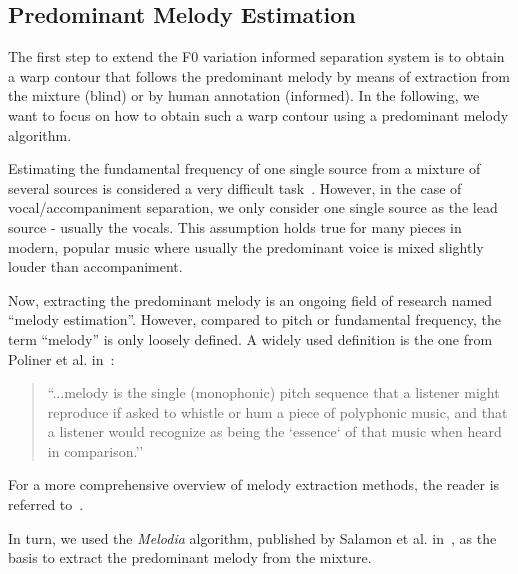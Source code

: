 \subsection{Predominant Melody Estimation}

The first step to extend the F0 variation informed separation system is to obtain a warp contour that follows the predominant melody by means of extraction from the mixture (blind) or by human annotation (informed).
In the following, we want to focus on how to obtain such a warp contour using a predominant melody algorithm.\par

Estimating the fundamental frequency of one single source from a mixture of several sources is considered a very difficult task~\cite{klapuri08}.
However, in the case of vocal/accompaniment separation, we only consider one single source as the lead source - usually the vocals.
This assumption holds true for many pieces in modern, popular music where usually the predominant voice is mixed slightly louder than accompaniment.
\par
Now, extracting the predominant melody is an ongoing field of research named ``melody estimation''.
However, compared to pitch or fundamental frequency, the term ``melody'' is only loosely defined.
A widely used definition is the one from Poliner et al. in~\cite{poliner07}:

\begin{quote}
  ``...melody is the single (monophonic) pitch sequence that a listener might reproduce if asked to whistle or hum a piece of polyphonic music, and that a listener would recognize as being the `essence` of that music when heard in comparison.''
\end{quote}

For a more comprehensive overview of melody extraction methods, the reader is referred to~\cite{salamon14}.

In turn, we used the \emph{Melodia} algorithm, published by Salamon et al. in~\cite{salamon12}, as the basis to extract the predominant melody from the mixture.\par

